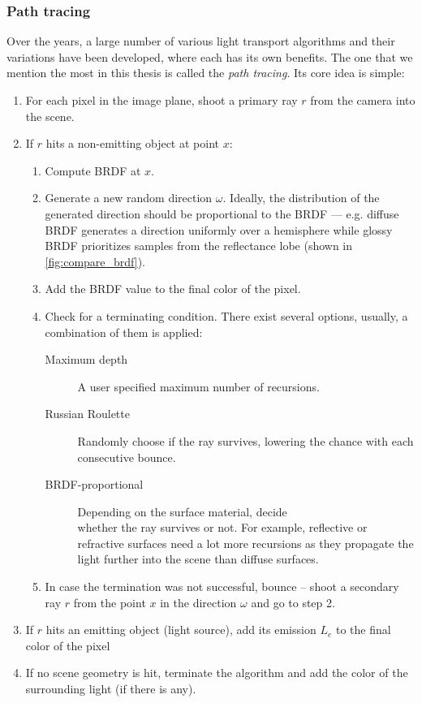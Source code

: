 \subsubsection{Path tracing}
Over the years, a large number of various light transport algorithms and their variations have been developed, where each has its own benefits. The one that we mention the most in this thesis is called the \emph{path tracing}. Its core idea is simple:

\renewcommand{\labelenumii}{\theenumii}
\renewcommand{\theenumii}{\theenumi.\arabic{enumii}.}
\begin{enumerate}
	\item For each pixel in the image plane, shoot a primary ray $r$ from the camera into the scene.
	\item If $r$ hits a non-emitting object at point $x$:
	\begin{enumerate}
		\item Compute BRDF at $x$.
		\item Generate a new random direction $\omega$. Ideally, the distribution of the generated direction should be proportional to the BRDF --- e.g. diffuse BRDF generates a direction uniformly over a hemisphere while glossy BRDF prioritizes samples from the reflectance lobe (shown in \autoref{fig:compare_brdf}).
		\item Add the BRDF value to the final color of the pixel.
		\item Check for a terminating condition. There exist several options, usually, a combination of them is applied:
			\begin{description}
				\item [Maximum depth] A user specified maximum number of recursions.
				\item [Russian Roulette] Randomly choose if the ray survives, lowering the chance with each consecutive bounce.
				\item [BRDF-proportional] Depending on the surface material, decide \\ whether the ray survives or not. For example, reflective or refractive surfaces need a lot more recursions as they propagate the light further into the scene than diffuse surfaces.
			\end{description}
		\item In case the termination was not successful, bounce -- shoot a secondary ray $r$ from the point $x$ in the direction $\omega$ and go to step 2.
	\end{enumerate}
	\item If $r$ hits an emitting object (light source), add its emission $L_e$ to the final color of the pixel
	\item If no scene geometry is hit, terminate the algorithm and add the color of the surrounding light (if there is any).
\end{enumerate}

